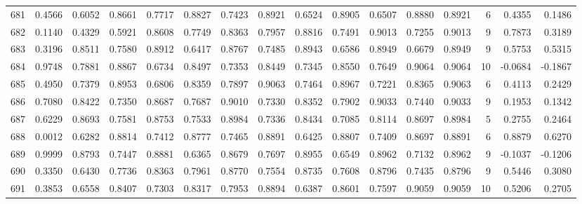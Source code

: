 \begin{tabular}{lrrrrrrrrrrrrrrr}
681 &      0.4566 &  0.6052 &  0.8661 &  0.7717 &  0.8827 &  0.7423 &  0.8921 &  0.6524 &  0.8905 &  0.6507 &   0.8880 &     0.8921 &      6 &                    0.4355 &                     0.1486 \\
682 &      0.1140 &  0.4329 &  0.5921 &  0.8608 &  0.7749 &  0.8363 &  0.7957 &  0.8816 &  0.7491 &  0.9013 &   0.7255 &     0.9013 &      9 &                    0.7873 &                     0.3189 \\
683 &      0.3196 &  0.8511 &  0.7580 &  0.8912 &  0.6417 &  0.8767 &  0.7485 &  0.8943 &  0.6586 &  0.8949 &   0.6679 &     0.8949 &      9 &                    0.5753 &                     0.5315 \\
684 &      0.9748 &  0.7881 &  0.8867 &  0.6734 &  0.8497 &  0.7353 &  0.8449 &  0.7345 &  0.8550 &  0.7649 &   0.9064 &     0.9064 &     10 &                   -0.0684 &                    -0.1867 \\
685 &      0.4950 &  0.7379 &  0.8953 &  0.6806 &  0.8359 &  0.7897 &  0.9063 &  0.7464 &  0.8967 &  0.7221 &   0.8365 &     0.9063 &      6 &                    0.4113 &                     0.2429 \\
686 &      0.7080 &  0.8422 &  0.7350 &  0.8687 &  0.7687 &  0.9010 &  0.7330 &  0.8352 &  0.7902 &  0.9033 &   0.7440 &     0.9033 &      9 &                    0.1953 &                     0.1342 \\
687 &      0.6229 &  0.8693 &  0.7581 &  0.8753 &  0.7533 &  0.8984 &  0.7336 &  0.8434 &  0.7085 &  0.8114 &   0.8697 &     0.8984 &      5 &                    0.2755 &                     0.2464 \\
688 &      0.0012 &  0.6282 &  0.8814 &  0.7412 &  0.8777 &  0.7465 &  0.8891 &  0.6425 &  0.8807 &  0.7409 &   0.8697 &     0.8891 &      6 &                    0.8879 &                     0.6270 \\
689 &      0.9999 &  0.8793 &  0.7447 &  0.8881 &  0.6365 &  0.8679 &  0.7697 &  0.8955 &  0.6549 &  0.8962 &   0.7132 &     0.8962 &      9 &                   -0.1037 &                    -0.1206 \\
690 &      0.3350 &  0.6430 &  0.7736 &  0.8363 &  0.7961 &  0.8770 &  0.7554 &  0.8735 &  0.7608 &  0.8796 &   0.7435 &     0.8796 &      9 &                    0.5446 &                     0.3080 \\
691 &      0.3853 &  0.6558 &  0.8407 &  0.7303 &  0.8317 &  0.7953 &  0.8894 &  0.6387 &  0.8601 &  0.7597 &   0.9059 &     0.9059 &     10 &                    0.5206 &                     0.2705 \\

\end{tabular}
